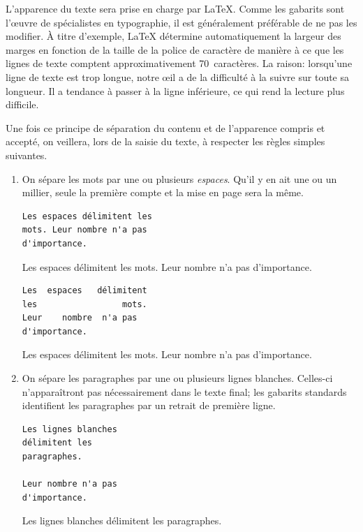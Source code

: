 L'apparence du texte sera prise en charge par {\LaTeX}. Comme les
gabarits sont l'{\oe}uvre de spécialistes en typographie, il est
généralement préférable de ne pas les modifier. À titre d'exemple,
{\LaTeX} détermine automatiquement la largeur des marges en fonction
de la taille de la police de caractère de manière à ce que les lignes
de texte comptent approximativement 70~caractères. La raison:
lorsqu'une ligne de texte est trop longue, notre {\oe}il a de la
difficulté à la suivre sur toute sa longueur. Il a tendance à passer à
la ligne inférieure, ce qui rend la lecture plus difficile.

Une fois ce principe de séparation du contenu et de l'apparence
compris et accepté, on veillera, lors de la saisie du texte, à
respecter les règles simples suivantes.
\begin{enumerate}
\item On sépare les mots par une ou plusieurs \emph{espaces}. Qu'il y
  en ait une ou un millier, seule la première compte et la mise en
  page sera la même.
  \begin{demo}
    \begin{texample}
\begin{lstlisting}
Les espaces délimitent les
mots. Leur nombre n'a pas
d'importance.
\end{lstlisting}
      \producing
      Les espaces délimitent les
      mots. Leur nombre n'a pas
      d'importance.
    \end{texample}
    \begin{texample}
\begin{lstlisting}[showstringspaces=true]
Les  espaces   délimitent
les                 mots.
Leur    nombre  n'a pas
d'importance.
\end{lstlisting}
      \producing
      Les  espaces   délimitent
      les                 mots.
      Leur    nombre  n'a pas
      d'importance.
    \end{texample}
  \end{demo}
%
\item On sépare les paragraphes par une ou plusieurs lignes blanches.
  Celles-ci n'apparaîtront pas nécessairement dans le texte final; les
  gabarits standards identifient les paragraphes par un retrait de
  première ligne.
  \begin{demo}
    \begin{texample}
\begin{lstlisting}
Les lignes blanches
délimitent les
paragraphes.

Leur nombre n'a pas
d'importance.
\end{lstlisting}
      \producing
Les lignes blanches
délimitent les
paragraphes.


\end{texample}
\end{demo}
\end{enumerate}
